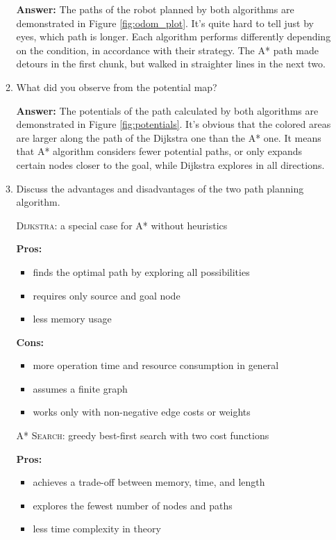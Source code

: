 \documentclass[12pt]{article}
\begin{document}
\begin{enumerate}
\begin{enumerate}
        \textbf{Answer: }The paths of the robot planned by both algorithms are demonstrated in Figure \ref{fig:odom_plot}. It's quite hard to tell just by eyes, which path is longer. Each algorithm performs differently depending on the condition, in accordance with their strategy. The A* path made detours in the first chunk, but walked in straighter lines in the next two.
        
        \item What did you observe from the potential map?
        
        \textbf{Answer: }The potentials of the path calculated by both algorithms are demonstrated in Figure \ref{fig:potentials}. It's obvious that the colored areas are larger along the path of the Dijkstra one than the A* one. It means that A* algorithm considers fewer potential paths, or only expands certain nodes closer to the goal, while Dijkstra explores in all directions.
       
        \item Discuss the advantages and disadvantages of the two path planning algorithm.
        
        \begin{multicols}{2}

            \textsc{Dijkstra}: a special case for A* without heuristics
            
            \textbf{Pros:}
            \begin{itemize}
                \item finds the optimal path by exploring all possibilities
                \item requires only source and goal node
                \item less memory usage
            \end{itemize}
            
            \textbf{Cons:}
            \begin{itemize}
                \item more operation time and resource consumption in general
                \item assumes a finite graph
                \item works only with non-negative edge costs or weights
            \end{itemize}

        \columnbreak
            \textsc{A* Search}: greedy best-first search with two cost functions
            
            \textbf{Pros:}
            \begin{itemize}
                \item achieves a trade-off between memory, time, and length
                \item explores the fewest number of nodes and paths
                \item less time complexity in theory
            \end{itemize}
            

\end{multicols}
\end{enumerate}
\end{enumerate}
\end{document}

